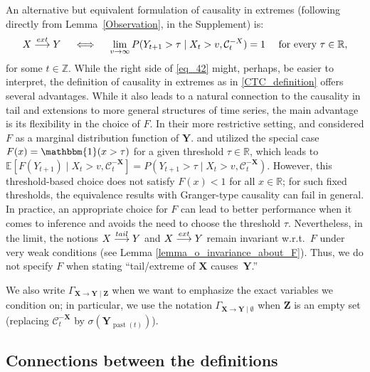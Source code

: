\documentclass[a4paper,11pt]{article}
\newcommand{\toverset}[2]{\overset{{\rm #1}}{#2}}
\DeclareMathOperator{\past}{past}
\begin{document}
An alternative but equivalent formulation of causality in extremes (following directly from Lemma~\ref{Observation}, in the Supplement) is: 
\begin{equation}\label{eq_42}
    \textbf{X}\toverset{ext}{\longrightarrow}\textbf{Y} \quad \iff  \quad \lim_{v\to\infty}P(Y_{t+1}>\tau\mid X_t>v, \mathcal{C}^{-\textbf{X}}_t) = 1 \quad \text{ for every }\tau\in\mathbb{R},
\end{equation}
for some $t\in\mathbb Z$. While the right side of \eqref{eq_42} might, perhaps, be easier to interpret, the definition of causality in extremes as in \eqref{CTC_definition} offers several advantages. While it also leads to a natural connection to the causality in tail and extensions to more general structures of time series, the main advantage is its flexibility in the choice of $F$. 
In their more restrictive setting, \cite{Gnecco} and \cite{bodik} considered $F$ as a marginal distribution function of $\textbf{Y}$. 
\cite{hong2009granger} and \cite{Mazzarisi_causality_in_tail} utilized the special case $F(x) = \mathbbm{1}(x > \tau)$ for a given threshold $\tau\in\mathbb{R}$, which leads to $ \mathbb{E}[ F(Y_{t+1})\mid X_t>v,\mathcal{C}^{-\textbf{X}}_t] = P( Y_{t+1} > \tau \mid X_t>v,\mathcal{C}^{-\textbf{X}}_t)$. 
However, this threshold-based choice does not satisfy \(F(x)<1\) for all \(x\in\mathbb R\); for such fixed thresholds, the equivalence results with Granger-type causality can fail in general. In practice, an appropriate choice for $F$ can lead to better performance when it comes to inference and avoids the need to choose the threshold $\tau$. 
Nevertheless, in the limit, the notions \( \textbf{X} \toverset{tail}{\longrightarrow} \textbf{Y} \) and \( \textbf{X} \toverset{ext}{\longrightarrow} \textbf{Y} \) remain invariant w.r.t.\ $F$ under very weak conditions (see Lemma \ref{lemma_o_invariance_about_F}). 
Thus, we do not specify \( F \) when stating ``tail/extreme of $\textbf{X}$ causes~$\textbf{Y}$.'' 


We also write $\Gamma_{\textbf{X}\to\textbf{Y}\mid\textbf{Z}}$ when we want to emphasize the exact variables we condition on; in particular, we use the notation $\Gamma_{\textbf{X}\to\textbf{Y}\mid\emptyset}$ when $\textbf{Z}$ is an empty set (replacing $\mathcal{C}^{-\textbf{X}}_t$ by $\sigma(\textbf{Y}_{\past(t)})$). 


\subsection{Connections between the definitions}
\label{Section_Reformulating}
\end{document}
